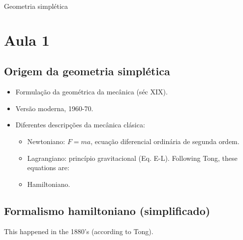 




{\Huge Geometria simpl\'etica}

\section{Aula 1}
\subsection{Origem da geometria simpl\'etica}
\begin{itemize}
	\item Formula\c c\~ao da geom\'etrica da mec\^anica (s\'ec XIX).
	\item Vers\~ao moderna, 1960-70.
	\item Diferentes descrip\c c\~oes da mec\^anica cl\'asica:
		\begin{itemize}
			\item Newtoniano: $F=ma$, ecua\c c\~ao diferencial ordin\'aria de segunda ordem.
			\item Lagrangiano: princ\'ipio gravitacional (Eq. E-L). Following Tong, these equations are:

			\item Hamiltoniano.
		\end{itemize}
\end{itemize}

\subsection{Formalismo hamiltoniano (simplificado)}

This happened in the 1880's (according to Tong).


